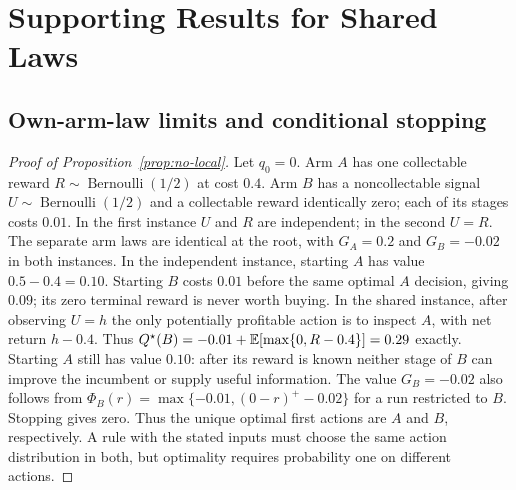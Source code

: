 \section{Supporting Results for Shared Laws}
\label{app:sharing}

\subsection{Own-arm-law limits and conditional stopping}

\begin{proof}[Proof of Proposition~\ref{prop:no-local}]
Let $q_0=0$. Arm $A$ has one collectable reward $R\sim\operatorname{Bernoulli}(1/2)$ at cost
$0.4$. Arm $B$ has a noncollectable signal $U\sim\operatorname{Bernoulli}(1/2)$ and a
collectable reward identically zero; each of its stages costs $0.01$. In the first instance
$U$ and $R$ are independent; in the second $U=R$. The separate arm laws are identical at the
root, with $G_A=0.2$ and $G_B=-0.02$ in both instances.
In the independent instance, starting $A$ has value $0.5-0.4=0.10$. Starting $B$ costs $0.01$
before the same optimal $A$ decision, giving $0.09$; its zero terminal reward is never worth
buying. In the shared instance, after observing $U=h$ the only potentially profitable action
is to inspect $A$, with net return $h-0.4$. Thus
$Q^\star(B)=-0.01+\mathbb{E}[\max\{0,R-0.4\}]=0.29$ exactly. Starting $A$ still has value $0.10$:
after its reward is known neither stage of $B$ can improve the incumbent or supply useful
information. The value $G_B=-0.02$ also follows from
$\Phi_B(r)=\max\{-0.01,(0-r)^+-0.02\}$ for a run restricted to $B$.
Stopping gives zero. Thus the unique optimal first actions are $A$ and $B$, respectively.
A rule with the stated inputs must choose the same action distribution in both, but optimality
requires probability one on different actions.
\end{proof}

